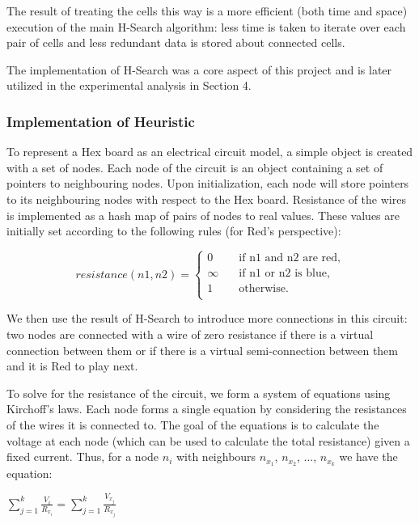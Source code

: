  
 
 The result of treating the cells this way is a more efficient (both time and space) execution of the main H-Search algorithm: less time is taken to iterate over each pair of cells and less redundant data is stored about connected cells.
 
 The implementation of H-Search was a core aspect of this project and is later utilized in the experimental analysis in Section 4.
 
 
 \subsubsection{Implementation of Heuristic}
 
 
 To represent a Hex board as an electrical circuit model, a simple object is created with a set of nodes. Each node of the circuit is an object containing a set of pointers to neighbouring nodes. Upon initialization, each node will store pointers to its neighbouring nodes with respect to the Hex board. Resistance of the wires is implemented as a hash map of pairs of nodes to real values. These values are initially set according to the following rules (for Red's perspective): 
 
 
 \[
 resistance(n1,n2) = \begin{cases}
                        \text{0} &\quad\text{if n1 and n2 are red,}\\
                        \text{$\infty$} &\quad\text{if n1 or n2 is blue,}\\
                        \text{1} &\quad\text{otherwise.}\\
                    \end{cases}
\]

We then use the result of H-Search to introduce more connections in this circuit: two nodes are connected with a wire of zero resistance if there is a virtual connection between them or if there is a virtual semi-connection between them and it is Red to play next.

To solve for the resistance of the circuit, we form a system of equations using Kirchoff's laws. Each node forms a single equation by considering the resistances of the wires it is connected to. The goal of the equations is to calculate the voltage at each node (which can be used to calculate the total resistance) given a fixed current. Thus, for a node $n_i$ with neighbours $n_{x_1}$, $n_{x_2}$, ..., $n_{x_k}$ we have the equation:

\begin{center}
$\sum_{j=1}^{k}\frac{V_i}{R_{x_i}} = \sum_{j=1}^{k}\frac{V_{x_j}}{R_{x_j}}$
\end{center}















